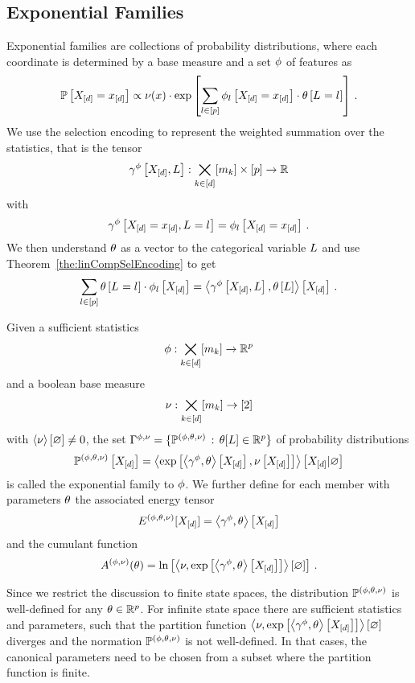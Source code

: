\subsection{Exponential Families}\label{sec:exponentialFamilies}

Exponential families are collections of probability distributions, where each coordinate is determined by a base measure and a set $\phi$ of features as
	\[ \mathbb{P}\left[X_{[d]}=x_{[d]}\right]  \propto \nu(x) \cdot \mathrm{exp}\left[\sum_{l\in[p]} \phi_{l}\left[X_{[d]}=x_{[d]}\right] \cdot \theta\left[L_{}=l_{}\right]\right] \, . \]
We use the selection encoding to represent the weighted summation over the statistics, that is the tensor
	\[ \gamma^{\phi}\left[X_{[d]},L\right]: \bigtimes_{k\in[d]}[m_{k}] \times [p] \rightarrow \mathbb{R} \]
with
	\[ \gamma^{\phi}\left[X_{[d]}=x_{[d]},L_{}=l_{}\right] = \phi_{l}\left[X_{[d]}=x_{[d]}\right] \, . \]
We then understand $\theta$ as a vector to the categorical variable $L$ and use Theorem~\ref{the:linCompSelEncoding} to get
	\[ \sum_{l\in[p]}\theta\left[L_{}=l_{}\right]\cdot \phi_{l}\left[X_{[d]}\right]
		 = \left\langle \gamma^{\phi}\left[X_{[d]},L\right],\theta\left[L\right]\right\rangle \left[ X_{[d]} \right] \, . \]

\begin{definition}
	Given a sufficient statistics 
		\[ \phi : \bigtimes_{k\in[d]}[m_{k}] \rightarrow \mathbb{R}^p\]
	and a boolean base measure
		\[ \nu : \bigtimes_{k\in[d]}[m_{k}] \rightarrow [2] \]
	with $\left\langle \nu\right\rangle \left[ \varnothing \right]\neq0$,  the set $\Gamma^{\phi,\nu}=\{\mathbb{P}^{(\phi,\theta,\nu)} \, : \, \theta[L] \in \mathbb{R}^{p}\}$ of probability distributions 
		\[ \mathbb{P}^{(\phi,\theta,\nu)}\left[X_{[d]}\right] = \left\langle \mathrm{exp}\left[\left\langle \gamma^{\phi},\theta\right\rangle \left[ X_{[d]} \right],\nu\left[X_{[d]}\right]\right]\right\rangle \left[ X_{[d]} | \varnothing \right] \]
	is called the exponential family to $\phi$.
	We further define for each member with parameters $\theta$ the associated energy tensor
		\[ E^{(\phi,\theta,\nu)}[X_{[d]}] = \left\langle \gamma^{\phi},\theta\right\rangle \left[ X_{[d]} \right] \]
	and the cumulant function
		\[ A^{(\phi,\nu)}(\theta) = \ln \left[ \left\langle \nu,\mathrm{exp}\left[\left\langle \gamma^{\phi},\theta\right\rangle \left[ X_{[d]} \right] \right]\right\rangle \left[ \varnothing \right]  \right] \, .\]
\end{definition}



Since we restrict the discussion to finite state spaces, the distribution $\mathbb{P}^{(\phi,\theta,\nu)}$ is well-defined for any $\theta\in\mathbb{R}^{p}$.
For infinite state space there are sufficient statistics and parameters, such that the partition function $\left\langle \nu,\mathrm{exp}\left[\left\langle \gamma^{\phi},\theta\right\rangle \left[ X_{[d]} \right]\right]\right\rangle \left[ \varnothing \right]$ diverges and the normation $\mathbb{P}^{(\phi,\theta,\nu)}$ is not well-defined.
In that cases, the canonical parameters need to be chosen from a subset where the partition function is finite. 


